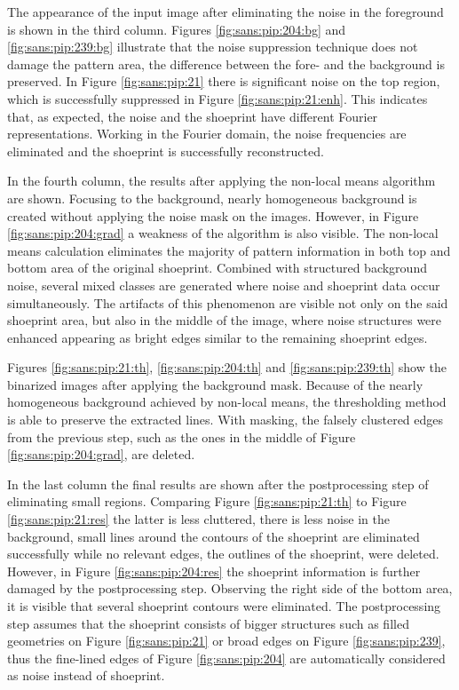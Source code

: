 \documentclass[draft,final]{vutinfth} %
\begin{document}
\par
The appearance of the input image after eliminating the noise in the foreground is shown in the third column.
Figures  \ref{fig:sans:pip:204:bg} and \ref{fig:sans:pip:239:bg} illustrate that the noise suppression technique does not damage the pattern area, the difference between the fore- and the background is preserved.
In Figure \ref{fig:sans:pip:21} there is significant noise on the top region, which is successfully suppressed in Figure \ref{fig:sans:pip:21:enh}.
This indicates that, as expected, the noise and the shoeprint have different Fourier representations.
Working in the Fourier domain, the noise frequencies are eliminated and the shoeprint is successfully reconstructed.
\par
In the fourth column, the results after applying the non-local means algorithm are shown.
Focusing to the background, nearly homogeneous background is created without applying the noise mask on the images.
However, in Figure \ref{fig:sans:pip:204:grad} a weakness of the algorithm is also visible.
The non-local means calculation eliminates the majority of pattern information in both top and bottom area of the original shoeprint.
Combined with structured background noise, several mixed classes are generated where noise and shoeprint data occur simultaneously.
The artifacts of this phenomenon are visible not only on the said shoeprint area, but also in the middle of the image, where noise structures were enhanced appearing as bright edges similar to the remaining shoeprint edges.
\par
Figures \ref{fig:sans:pip:21:th}, \ref{fig:sans:pip:204:th} and \ref{fig:sans:pip:239:th} show the binarized images after applying the background mask.
Because of the nearly homogeneous background achieved by non-local means, the thresholding method is able to preserve the extracted lines.
With masking, the falsely clustered edges from the previous step, such as the ones in the middle of Figure \ref{fig:sans:pip:204:grad}, are deleted.
\par
In the last column the final results are shown after the postprocessing step of eliminating small regions.
Comparing Figure \ref{fig:sans:pip:21:th} to  Figure \ref{fig:sans:pip:21:res} the latter is less cluttered, there is less noise in the background, small lines around the contours of the shoeprint are eliminated successfully while no relevant edges, the outlines of the shoeprint, were deleted.
However, in Figure \ref{fig:sans:pip:204:res} the shoeprint information is further damaged by the postprocessing step.
Observing the right side of the bottom area, it is visible that several shoeprint contours were eliminated.
The postprocessing step assumes that the shoeprint consists of bigger structures such as filled geometries on Figure \ref{fig:sans:pip:21} or broad edges on Figure \ref{fig:sans:pip:239}, thus the fine-lined edges of Figure \ref{fig:sans:pip:204} are automatically considered as noise instead of shoeprint.
\end{document}
